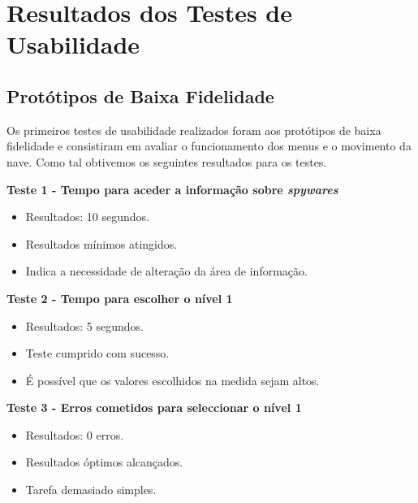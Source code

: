 \chapter{Resultados dos Testes de Usabilidade}
\label{chap:results} 
\section{Protótipos de Baixa Fidelidade}

Os primeiros testes de usabilidade realizados foram aos protótipos de baixa fidelidade e consistiram em avaliar o funcionamento dos menus e o movimento da nave. Como tal obtivemos os seguintes resultados para os testes.

\textbf{Teste 1 - Tempo para aceder a informação sobre \textit{spywares}}

\begin{itemize}

\item Resultados: 10 segundos.

\item Resultados mínimos atingidos.

\item Indica a necessidade de alteração da área de informação. 
\end{itemize}

\textbf{Teste 2 - Tempo para escolher o nível 1}

\begin{itemize}

\item Resultados: 5 segundos.

\item Teste cumprido com sucesso.

\item É possível que os valores escolhidos na medida sejam altos.
\end{itemize}

\textbf{Teste 3 - Erros cometidos para seleccionar o nível 1}

\begin{itemize}

\item Resultados: 0 erros.

\item Resultados óptimos alcançados.

\item Tarefa demasiado simples.
\end{itemize}


